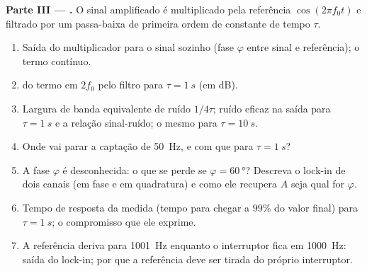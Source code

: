 \begin{problem}
\medskip
\noindent\textbf{Parte III --- .}
O sinal amplificado é multiplicado pela referência $\cos(2\pi f_0t)$
e filtrado por um passa-baixa de primeira ordem de constante de tempo $\tau$.
\begin{enumerate}[resume]
  \item Saída do multiplicador para o sinal sozinho (fase $\varphi$
        entre sinal e referência); o termo contínuo.
  \item {} do termo em $2f_0$ pelo filtro para $\tau = \qty{1}{s}$
        (em dB).
  \item Largura de banda equivalente de ruído $1/4\tau$; ruído eficaz na saída
        para $\tau = \qty{1}{s}$ e a relação sinal-ruído; o mesmo para $\tau = \qty{10}{s}$.
  \item Onde vai parar a captação de \qty{50}{Hz}, e com que
         para $\tau = \qty{1}{s}$?
  \item A fase $\varphi$ é desconhecida: o que se perde se $\varphi = \qty{60}{\degree}$?
        Descreva o lock-in de dois canais (em fase e em quadratura) e
        como ele recupera $A$ seja qual for $\varphi$.
  \item Tempo de resposta da medida (tempo para chegar a $99\%$ do
        valor final) para $\tau = \qty{1}{s}$; o compromisso que ele exprime.
  \item A referência deriva para \qty{1001}{Hz} enquanto o interruptor fica em
        \qty{1000}{Hz}: saída do lock-in; por que a referência deve ser
        tirada do próprio interruptor.
\end{enumerate}


\end{problem}
